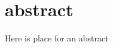 \documentclass[a4paper,12pt]{report}
\begin{document}



\section*{abstract}
Here is place for an abstract
\thispagestyle{plain}
\newpage

\tableofcontents
\newpage







\end{document}
